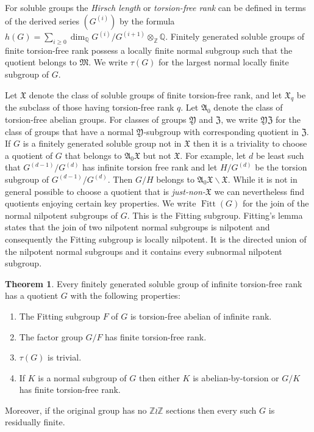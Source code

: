 \documentclass[11pt]{article}
\theoremstyle{definition}
\numberwithin{equation}{section}
\numberwithin{figure}{section}
\numberwithin{table}{section}
\renewcommand{\setminus}{\smallsetminus}
\newtheorem{theor}{Theorem}
\newcommand{\Q}{\mathbb{Q}}
\newcommand{\Z}{\mathbb{Z}}
\DeclareMathOperator{\Fitt}{Fitt}
\newcommand*{\romanenumi}{\renewcommand*{\theenumi}{\roman{enumi}}}
\begin{document}
For soluble groups the \emph{Hirsch length} or \emph{torsion-free rank} can be defined in terms of the derived series $(G^{(i)})$ by the formula $h(G)=\sum_{i\ge0}\dim_\Q G^{(i)}/G^{(i+1)}\otimes_\Z\Q$. Finitely generated soluble groups of finite torsion-free rank possess a locally finite normal subgroup such that the quotient belongs to $\mathfrak M$. We write $\tau(G)$ for the largest normal locally finite subgroup of $G$.

Let $\mathfrak X$ denote the class of soluble groups of finite torsion-free rank, and let $\mathfrak X_q$ be the subclass of those having torsion-free rank $q$. Let $\mathfrak A_0$ denote the class of torsion-free abelian groups. For classes of groups $\mathfrak Y$ and $\mathfrak Z$, we write $\mathfrak{YZ}$ for the class of groups that have a normal $\mathfrak Y$-subgroup with corresponding quotient in $\mathfrak Z$. If $G$ is a finitely generated soluble group not in $\mathfrak X$ then it is a triviality to choose a quotient of $G$ that belongs to $\mathfrak A_0\mathfrak X$ but not $\mathfrak X$. For example, let $d$ be least such that $G^{(d-1)}/G^{(d)}$ has infinite torsion free rank and let $H/G^{(d)}$ be the torsion subgroup of $G^{(d-1)}/G^{(d)}$. Then $G/H$ belongs to $\mathfrak A_0\mathfrak X\setminus\mathfrak X$. While it is not in general possible to choose a quotient that is \emph{just-non-$\mathfrak X$} we can nevertheless find quotients enjoying certain key properties. We write $\Fitt(G)$ for the join of the normal nilpotent subgroups of $G$. This is the Fitting subgroup. Fitting's lemma states that the join of two nilpotent normal subgroups is nilpotent and consequently the Fitting subgroup is locally nilpotent. It is the directed union of the nilpotent normal subgroups and it contains every subnormal nilpotent subgroup.
\setcounter{theor}{0}
\begin{theor}\label{theoa}
Every finitely generated soluble group of infinite torsion-free rank has a quotient $G$ with the following properties:
\begin{enumerate}\romanenumi
\item \label{listA.1}The Fitting subgroup $F$ of $G$ is torsion-free abelian of infinite rank.
\item \label{listA.2}The factor group $G/F$ has finite torsion-free rank.
\item \label{listA.3}$\tau(G)$ is trivial.
\item \label{listA.4}If $K$ is a normal subgroup of $G$ then either $K$ is abelian-by-torsion or $G/K$ has finite torsion-free rank.
\end{enumerate}
Moreover, if the original group has no $\Z\wr\Z$ sections then every such $G$ is residually finite.
\end{theor}
\end{document}
